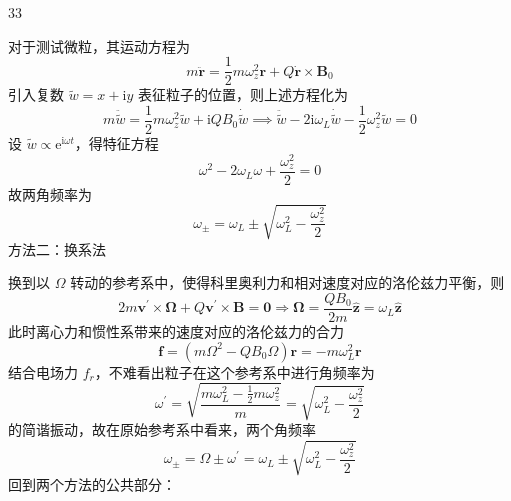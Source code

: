 \begin{solution}{33}
\begin{subsolution}
\begin{subsubsolution}
            对于测试微粒，其运动方程为
            \begin{equation}
                m \ddot {\pmb {r}} = \frac {1}{2} m \omega_ {z} ^ {2} \pmb {r} + Q \dot {\pmb {r}} \times \pmb {B} _ {0}
                \label{eq:8.s33}
            \end{equation}
            引入复数 $\tilde{w} = x + \mathrm{i}y$ 表征粒子的位置，则上述方程化为
            \begin{equation}
                m \ddot {\tilde {w}} = \frac {1}{2} m \omega_ {z} ^ {2} \tilde {w} + \mathrm{i} Q B _ {0} \dot {\tilde {w}} \implies \ddot {\tilde {w}} - 2 \mathrm{i} \omega_ {L} \dot {\tilde {w}} - \frac {1}{2} \omega_ {z} ^ {2} \tilde {w} = 0
                \label{eq:9.s33}
            \end{equation}
            设 $\tilde{w} \propto \mathrm{e}^{\mathrm{i}\omega t}$，得特征方程
            \begin{equation}
                \omega^ {2} - 2 \omega_ {L} \omega + \frac {\omega_ {z} ^ {2}}{2} = 0
                \label{eq:10.s33}
            \end{equation}
            故两角频率为
            \begin{equation}
                \omega_ {\pm} = \omega_ {L} \pm \sqrt {\omega_ {L} ^ {2} - \frac {\omega_ {z} ^ {2}}{2}}
                \label{eq:11.s33}
            \end{equation}
            方法二：换系法

            换到以 $\Omega$ 转动的参考系中，使得科里奥利力和相对速度对应的洛伦兹力平衡，则
            \begin{equation}
                2 m \pmb {v} ^ {\prime} \times \pmb {\Omega} + Q \pmb {v} ^ {\prime} \times \pmb {B} = \mathbf {0} \Rightarrow \pmb {\Omega} = \frac {Q B _ {0}}{2 m} \hat {\pmb {z}} = \omega_ {L} \hat {\pmb {z}}
                \label{eq:8'.s33}
            \end{equation}
            此时离心力和惯性系带来的速度对应的洛伦兹力的合力
            \begin{equation}
                \pmb {f} = (m \varOmega^ {2} - Q B _ {0} \varOmega) \pmb {r} = - m \omega_ {L} ^ {2} \pmb {r}
                \label{eq:9'.s33}
            \end{equation}
            结合电场力 $f_{r}$，不难看出粒子在这个参考系中进行角频率为
            \begin{equation}
                \omega^ {\prime} = \sqrt {\frac {m \omega_ {L} ^ {2} - \frac {1}{2} m \omega_ {z} ^ {2}}{m}} = \sqrt {\omega_ {L} ^ {2} - \frac {\omega_ {z} ^ {2}}{2}}
                \label{eq:10'.s33}
            \end{equation}
            的简谐振动，故在原始参考系中看来，两个角频率
            \begin{equation}
                \omega_ {\pm} = \varOmega \pm \omega^ {\prime} = \omega_ {L} \pm \sqrt {\omega_ {L} ^ {2} - \frac {\omega_ {z} ^ {2}}{2}}
                \label{eq:11'.s33}
            \end{equation}
            回到两个方法的公共部分：


\end{subsubsolution}
\end{subsolution}
\end{solution}
